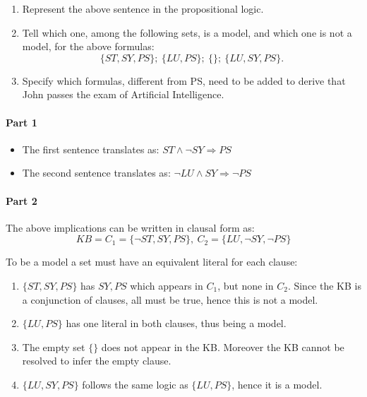 \documentclass[10pt,a4paper]{article}
\begin{document}
\begin{itemize}
\begin{enumerate}
\item Represent the above sentence in the propositional logic.
\item Tell which one, among the following sets, is a model, and which one is not a model, for the above formulas:
\[\lbrace ST,SY,PS\rbrace;\ \lbrace LU,PS\rbrace;\ \lbrace \rbrace;\ \lbrace LU,SY,PS\rbrace.\]
\item Specify which formulas, different from PS, need to be added to derive that John passes the exam of Artificial Intelligence.
\end{enumerate}

\paragraph{Part 1}
\begin{itemize}
\item The first sentence translates as: $ST \wedge \neg SY \Rightarrow PS$
\item The second sentence translates as: $\neg LU \wedge SY \Rightarrow \neg PS$
\end{itemize}

\paragraph{Part 2}
The above implications can be written in clausal form as:
\[KB=C_1=\lbrace \neg ST, SY, PS \rbrace,\ C_2=\lbrace LU, \neg SY, \neg PS \rbrace\]


To be a model a set must have an equivalent literal for each clause:
 

\begin{enumerate}

\item $\lbrace ST,SY,PS\rbrace$ has $SY,PS$ which appears in $C_1$, but none in $C_2$. Since the KB is a conjunction of clauses, all must be true, hence this is not a model.
\item $\lbrace LU,PS\rbrace$ has one literal in both clauses, thus being a model.
\item The empty set $\lbrace \rbrace$ does not appear in the KB. Moreover the KB cannot be resolved  to infer the empty clause.
\item $ \lbrace LU,SY,PS\rbrace$ follows the same logic as $\lbrace LU,PS\rbrace$, hence it is a model.
\end{enumerate}


\end{itemize}
\end{document}
